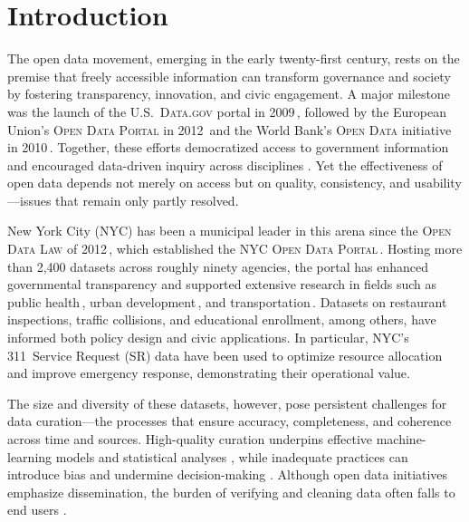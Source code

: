 \documentclass[linenumber]{jdsart}
\begin{document}
\section{Introduction}
\label{sec:intro}
The open data movement, emerging in the early twenty-first century, rests on 
the premise that freely accessible information can transform governance and 
society by fostering transparency, innovation, and civic engagement. 
A major milestone was the launch of the U.S.\ \textsc{Data.gov} portal in 
2009\,\citep{dataGov}, followed by the European Union’s 
\textsc{Open Data Portal} in 2012\,\citep{dataEU} and the World Bank’s 
\textsc{Open Data} initiative in 2010\,\citep{dataWorldBank}. 
Together, these efforts democratized access to government information and 
encouraged data-driven inquiry across disciplines 
\citep{barns2016mine,wang2016adoption}.  
Yet the effectiveness of open data depends not merely on access but on 
quality, consistency, and usability—issues that remain only partly resolved.

New York City (NYC) has been a municipal leader in this arena since the 
\textsc{Open Data Law} of 2012\,\citep{zuiderwijk2014open}, which established 
the \textsc{NYC Open Data Portal}\,\citep{dataNYC}. 
Hosting more than 2{,}400 datasets across roughly ninety agencies, the portal 
has enhanced governmental transparency and supported extensive research in 
fields such as public health\,\citep{cantor2018facets,shankar2021data}, urban 
development\,\citep{neves2020impacts}, and transportation\,\citep{gerte2019understanding}. 
Datasets on restaurant inspections, traffic collisions, and educational 
enrollment, among others, have informed both policy design and civic 
applications.  In particular, NYC’s 311~Service Request (\textsc{SR}) data have 
been used to optimize resource allocation and improve emergency response, 
demonstrating their operational value.

The size and diversity of these datasets, however, pose persistent challenges 
for data curation—the processes that ensure accuracy, completeness, and 
coherence across time and sources.  High-quality curation underpins effective 
machine-learning models and statistical analyses 
\citep{polyzotis2019data,jain2020overview}, while inadequate practices can 
introduce bias and undermine decision-making 
\citep{geiger2020garbage,rahm2000data}.  
Although open data initiatives emphasize dissemination, the burden of 
verifying and cleaning data often falls to end users 
\citep{cody2017cody,van2018statistical}.  
\end{document}
